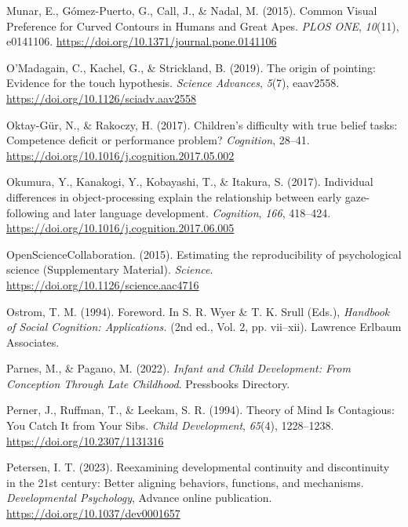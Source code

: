 \documentclass[
]{scrbook}
\newlength{\cslhangindent}
\newenvironment{CSLReferences}[2] %
 {\begin{list}{}{%
  \setlength{\itemindent}{0pt}
  \setlength{\leftmargin}{0pt}
  \setlength{\parsep}{0pt}
  \ifodd #1
   \setlength{\leftmargin}{\cslhangindent}
   \setlength{\itemindent}{-1\cslhangindent}
  \fi
  \setlength{\itemsep}{#2\baselineskip}}}
 {\end{list}}
\begin{document}
\begin{CSLReferences}{1}{0}
Munar, E., Gómez-Puerto, G., Call, J., \& Nadal, M. (2015). Common {Visual Preference} for {Curved Contours} in {Humans} and {Great Apes}. \emph{PLOS ONE}, \emph{10}(11), e0141106. \url{https://doi.org/10.1371/journal.pone.0141106}

O'Madagain, C., Kachel, G., \& Strickland, B. (2019). The origin of pointing: {Evidence} for the touch hypothesis. \emph{Science Advances}, \emph{5}(7), eaav2558. \url{https://doi.org/10.1126/sciadv.aav2558}

Oktay-Gür, N., \& Rakoczy, H. (2017). Children's difficulty with true belief tasks: {Competence} deficit or performance problem? \emph{Cognition}, 28--41. \url{https://doi.org/10.1016/j.cognition.2017.05.002}

Okumura, Y., Kanakogi, Y., Kobayashi, T., \& Itakura, S. (2017). Individual differences in object-processing explain the relationship between early gaze-following and later language development. \emph{Cognition}, \emph{166}, 418--424. \url{https://doi.org/10.1016/j.cognition.2017.06.005}

OpenScienceCollaboration. (2015). Estimating the reproducibility of psychological science ({Supplementary Material}). \emph{Science}. \url{https://doi.org/10.1126/science.aac4716}

Ostrom, T. M. (1994). Foreword. In S. R. Wyer \& T. K. Srull (Eds.), \emph{Handbook of {Social Cognition}: {Applications}.} (2nd ed., Vol. 2, pp. vii--xii). Lawrence Erlbaum Associates.

Parnes, M., \& Pagano, M. (2022). \emph{Infant and {Child Development}: {From Conception Through Late Childhood}}. Pressbooks Directory.

Perner, J., Ruffman, T., \& Leekam, S. R. (1994). Theory of {Mind Is Contagious}: {You Catch It} from {Your Sibs}. \emph{Child Development}, \emph{65}(4), 1228--1238. \url{https://doi.org/10.2307/1131316}

Petersen, I. T. (2023). Reexamining developmental continuity and discontinuity in the 21st century: {Better} aligning behaviors, functions, and mechanisms. \emph{Developmental Psychology}, Advance online publication. \url{https://doi.org/10.1037/dev0001657}


\end{CSLReferences}
\end{document}
